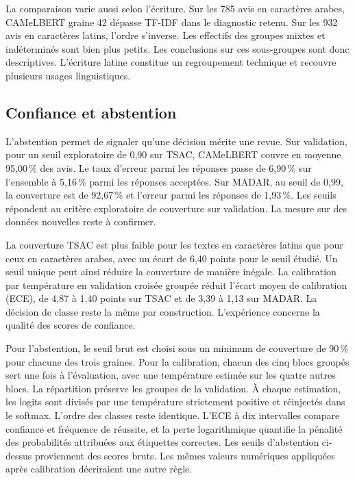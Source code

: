 La comparaison varie aussi selon l’écriture. Sur les 785 avis en caractères arabes, CAMeLBERT graine 42 dépasse TF-IDF dans le diagnostic retenu. Sur les 932 avis en caractères latins, l’ordre s’inverse. Les effectifs des groupes mixtes et indéterminés sont bien plus petits. Les conclusions sur ces sous-groupes sont donc descriptives. L’écriture latine constitue un regroupement technique et recouvre plusieurs usages linguistiques.

\subsection{Confiance et abstention}
L’abstention permet de signaler qu’une décision mérite une revue. Sur validation, pour un seuil exploratoire de 0,90 sur TSAC, CAMeLBERT couvre en moyenne 95,00\,\% des avis. Le taux d’erreur parmi les réponses passe de 6,90\,\% sur l’ensemble à 5,16\,\% parmi les réponses acceptées. Sur MADAR, au seuil de 0,99, la couverture est de 92,67\,\% et l’erreur parmi les réponses de 1,93\,\%. Les seuils répondent au critère exploratoire de couverture sur validation. La mesure sur des données nouvelles reste à confirmer.

La couverture TSAC est plus faible pour les textes en caractères latins que pour ceux en caractères arabes, avec un écart de 6,40 points pour le seuil étudié. Un seuil unique peut ainsi réduire la couverture de manière inégale. La calibration par température en validation croisée groupée réduit l’écart moyen de calibration (ECE), de 4,87 à 1,40 points sur TSAC et de 3,39 à 1,13 sur MADAR. La décision de classe reste la même par construction. L’expérience concerne la qualité des scores de confiance.

Pour l’abstention, le seuil brut est choisi sous un minimum de couverture de 90\,\% pour chacune des trois graines. Pour la calibration, chacun des cinq blocs groupés sert une fois à l’évaluation, avec une température estimée sur les quatre autres blocs. La répartition préserve les groupes de la validation. À chaque estimation, les logits sont divisés par une température strictement positive et réinjectés dans le softmax. L’ordre des classes reste identique. L’ECE à dix intervalles compare confiance et fréquence de réussite, et la perte logarithmique quantifie la pénalité des probabilités attribuées aux étiquettes correctes. Les seuils d’abstention ci-dessus proviennent des scores bruts. Les mêmes valeurs numériques appliquées après calibration décriraient une autre règle.

